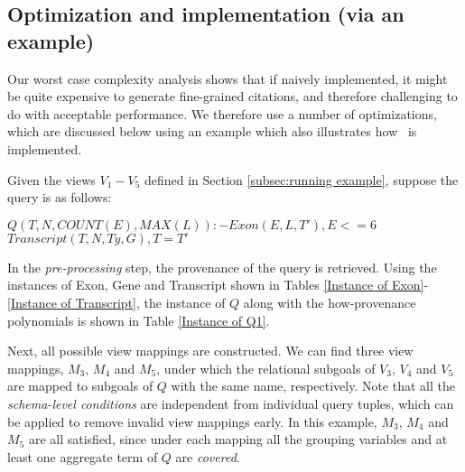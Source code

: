 \subsection{Optimization and implementation (via an example)}
Our worst case complexity analysis shows that if naively implemented, it might be quite expensive to generate fine-grained citations, and therefore challenging to do with acceptable performance.  We therefore use a number of optimizations, which are discussed below using an example which also illustrates how \provalg\ is implemented. 
\begin{example}
Given the views $V_1-V_5$ defined in Section \ref{subsec:running example}, suppose the query is as follows:
\begin{tabbing}
$Q(T, N, COUNT(E), MAX(L)):-Exon(E, L, T'), E <= 6$\\
\tab\tab\tab\tab$Transcript(T, N, Ty, G), T = T'$
\end{tabbing}
In the {\em pre-processing} step,  the provenance of the query is retrieved. Using the instances of Exon, Gene and Transcript shown in Tables \ref{Instance of Exon}-\ref{Instance of Transcript}, the instance of $Q$ along with the how-provenance polynomials is shown in Table \ref{Instance of Q1}. 

Next, all possible view mappings are constructed. We can find three view mappings, $M_3$, $M_4$ and $M_5$, under which the relational subgoals of $V_3$, $V_4$ and $V_5$ are mapped to subgoals of $Q$ with the same name, respectively. Note that all the {\em schema-level conditions} are independent from individual query tuples, which can be applied to remove invalid view mappings early. In this example, $M_3$, $M_4$ and $M_5$ are all satisfied, since under each mapping all the grouping variables and at least one aggregate term of $Q$ are {\em covered}.


\end{example}
